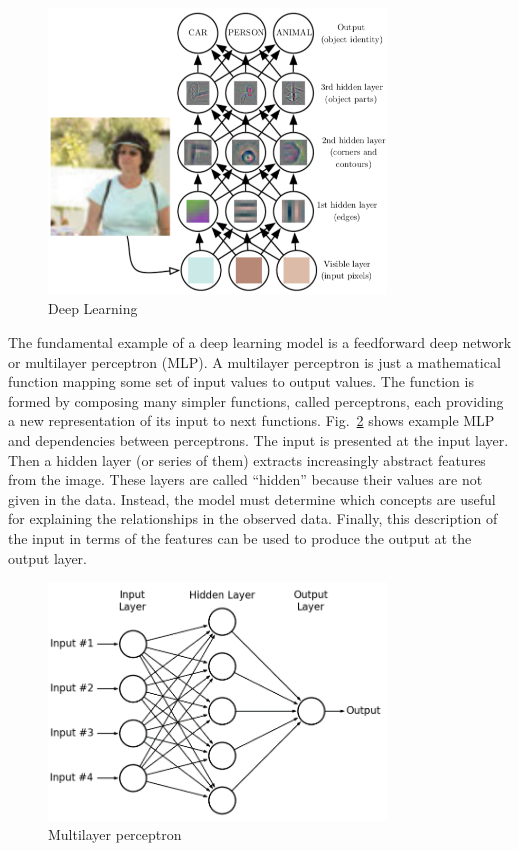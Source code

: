 \begin{figure}[H]
\includegraphics[width=0.8\textwidth,keepaspectratio]{figures/DL.png}
\caption[Deep Learning]{Deep Learning\protect\cite{Book.DeepLearning}}
\label{Fig.DL}
\end{figure}

The fundamental example of a deep learning model is a feedforward deep network or multilayer perceptron (MLP). A multilayer perceptron is just a mathematical function mapping some set of input values to output values. The function is formed by composing many simpler functions, called perceptrons, each providing a new representation of its input to next functions. Fig.~\ref{Fig.MLP} shows example MLP and dependencies between perceptrons. The input is presented at the input layer. Then a hidden layer (or series of them) extracts increasingly abstract features from the image. These layers are called “hidden” because their values are not given in the data. Instead, the model must determine which concepts are useful for explaining the relationships in the observed data. Finally, this description of the input in terms of the features can be used to produce the output at the output layer.

\begin{figure}[H]
\includegraphics[width=0.8\textwidth,keepaspectratio]{figures/MLP.png}
\caption{Multilayer perceptron}
\label{Fig.MLP}
\end{figure}

